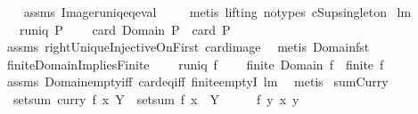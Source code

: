 \begin{isabellebody}
%
\isadelimproof
\ \ %
\endisadelimproof
%
\isatagproof
{}\isamarkupfalse%
\ assms\ Image{\isacharunderscore}runiq{\isacharunderscore}eq{\isacharunderscore}eval\ \isanewline
\ \ \isamarkupfalse%
\ {\isacharparenleft}metis\ {\isacharparenleft}lifting{\isacharcomma}\ no{\isacharunderscore}types{\isacharparenright}\ cSup{\isacharunderscore}singleton{\isacharparenright}%
\endisatagproof
{\isafoldproof}%
%
\isadelimproof
\isanewline
%
\endisadelimproof
\isanewline
{}\isamarkupfalse%
\ lm{}{}{}{\isacharcolon}\ \isanewline
\ \ \ {\isachardoublequoteopen}runiq\ P{\isachardoublequoteclose}\ \isanewline
\ \ \ {\isachardoublequoteopen}card\ {\isacharparenleft}Domain\ P{\isacharparenright}\ {\isacharequal}\ card\ P{\isachardoublequoteclose}\ \isanewline
%
\isadelimproof
\ \ %
\endisadelimproof
%
\isatagproof
{}\isamarkupfalse%
\ assms\ rightUniqueInjectiveOnFirst\ card{\isacharunderscore}image\ \isamarkupfalse%
\ {\isacharparenleft}metis\ Domain{\isacharunderscore}fst{\isacharparenright}%
\endisatagproof
{\isafoldproof}%
%
\isadelimproof
\isanewline
%
\endisadelimproof
\isanewline
{}\isamarkupfalse%
\ finiteDomainImpliesFinite{\isacharcolon}\ \isanewline
\ \ \ {\isachardoublequoteopen}runiq\ f{\isachardoublequoteclose}\ \isanewline
\ \ \ {\isachardoublequoteopen}finite\ {\isacharparenleft}Domain\ f{\isacharparenright}\ {\isacharequal}\ finite\ f{\isachardoublequoteclose}\ \isanewline
%
\isadelimproof
\ \ %
\endisadelimproof
%
\isatagproof
{}\isamarkupfalse%
\ assms\ Domain{\isacharunderscore}empty{\isacharunderscore}iff\ card{\isacharunderscore}eq{\isacharunderscore}{}{\isacharunderscore}iff\ finite{\isachardot}emptyI\ lm{}{}{}\ \isamarkupfalse%
\ metis%
\endisatagproof
{\isafoldproof}%
%
\isadelimproof
\isanewline
%
\endisadelimproof
\isanewline
\isanewline
{}\isamarkupfalse%
\ sumCurry{\isacharcolon}\ \isanewline
\ \ {\isachardoublequoteopen}setsum\ {\isacharparenleft}{\isacharparenleft}curry\ f{\isacharparenright}\ x{\isacharparenright}\ Y\ {\isacharequal}\ setsum\ f\ {\isacharparenleft}{\isacharbraceleft}x{\isacharbraceright}\ {\isasymtimes}\ Y{\isacharparenright}{\isachardoublequoteclose}\isanewline
%
\isadelimproof
%
\endisadelimproof
%
\isatagproof
{}\isamarkupfalse%
\ {\isacharminus}\isanewline
\ \ \isamarkupfalse%
\ {\isacharquery}f{\isacharequal}{\isachardoublequoteopen}{\isacharpercent}\ y{\isachardot}\ {\isacharparenleft}x{\isacharcomma}\ y{\isacharparenright}{\isachardoublequoteclose}\ \isamarkupfalse%

\end{isabellebody}
